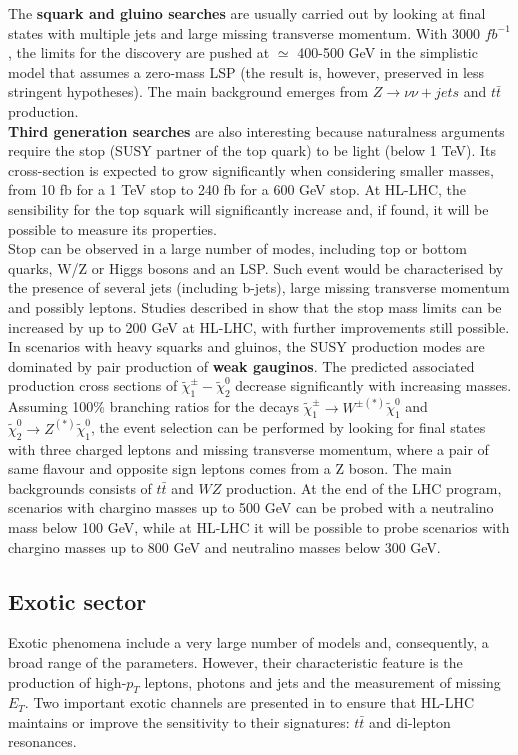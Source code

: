 \documentclass[a4paper,twoside,12pt]{article}
\begin{document}
The \textbf{squark and gluino searches} are usually carried out by looking at final states
with multiple jets and large missing transverse momentum. With 3000 $fb^{-1}$, the limits for the discovery are pushed at $\simeq$ 400-500 GeV\cite{loi} in the 
simplistic model that assumes a zero-mass LSP (the result is, however, preserved in less
stringent hypotheses). The main background emerges from $Z \rightarrow \nu\nu + jets$ and 
$t\bar{t}$ production.\\

\textbf{Third generation searches} are also interesting because naturalness arguments require
the stop (SUSY partner of the top quark) to be light (below 1 TeV). Its cross-section is expected to grow significantly when 
considering smaller masses, from 10 fb for a 1 TeV stop to 240 fb for a 600 GeV stop. At
HL-LHC, the sensibility for the top squark will significantly increase and, if found, it will be possible to measure its properties. \\

Stop can be observed in a large number of modes,
including top or bottom
quarks, W/Z or Higgs bosons and an LSP. Such event would be characterised by the presence
of several jets (including b-jets), large missing transverse momentum and possibly leptons. 
Studies described in \cite{loi} show that the stop mass limits can be increased by up to
200 GeV at HL-LHC, with further improvements still possible.\\

In scenarios with heavy squarks and gluinos, the SUSY production modes are dominated by 
pair production of \textbf{weak gauginos}. The predicted associated production cross sections of $\widetilde{\chi}_1^\pm - \widetilde{\chi}_2^0$  decrease significantly
with increasing masses. Assuming 100\% branching ratios for the decays
$\widetilde{\chi}_1^\pm \rightarrow W^{\pm(*)} \widetilde{\chi}_1^0$ and 
$\widetilde{\chi}_2^0 \rightarrow Z^{(*)}\widetilde{\chi}_1^0$, the event selection can be
performed by looking for final states with three charged leptons and missing transverse momentum,
where a pair of same flavour and opposite sign leptons comes from a Z boson. The main
backgrounds consists of $t\bar{t}$ and $WZ$ production.
At the end of the LHC program, scenarios with chargino masses up to 500 GeV can be probed
with a neutralino mass below 100 GeV, while at HL-LHC it will be possible to probe scenarios
with chargino masses up to 800 GeV and neutralino masses below 300 GeV.

\subsection{Exotic sector}
Exotic phenomena include a very large number of models and, consequently, a broad
range of the parameters. However, their characteristic feature is the production of high-$p_T$ 
leptons, photons and jets and the measurement of missing $E_T$. Two important exotic
channels are presented in \cite{loi} to ensure that HL-LHC maintains or improve the
sensitivity to their signatures: $t\bar{t}$ and di-lepton resonances.\\
\end{document}
